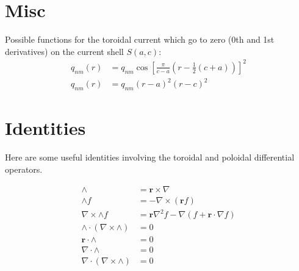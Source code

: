 \documentclass{article}
\newcommand{\R}{\mathbf{r}}
\begin{document}
\section{Misc}

Possible functions for the toroidal current which go to zero (0th and 1st
derivatives) on the current shell $S(a,c)$:
\begin{align}
q_{nm}(r) &= q_{nm} \cos{\left[ \frac{\pi}{c-a} \left( r - \frac{1}{2}(c+a) \right) \right]}^2 \\
q_{nm}(r) &= q_{nm} (r-a)^2 (r-c)^2
\end{align}

\section{Identities}

Here are some useful identities involving the toroidal and poloidal differential operators.

\begin{align}
\wedge &= \R \times \nabla \\
\wedge f &= -\nabla \times \left( \R f \right) \\
\nabla \times \wedge f &= \R \nabla^2 f - \nabla \left( f + \R \cdot \nabla f \right) \\
\wedge \cdot \left( \nabla \times \wedge \right) &= 0 \\
\R \cdot \wedge &= 0 \\
\nabla \cdot \wedge &= 0 \\
\nabla \cdot \left( \nabla \times \wedge \right) &= 0
\end{align}
\end{document}
